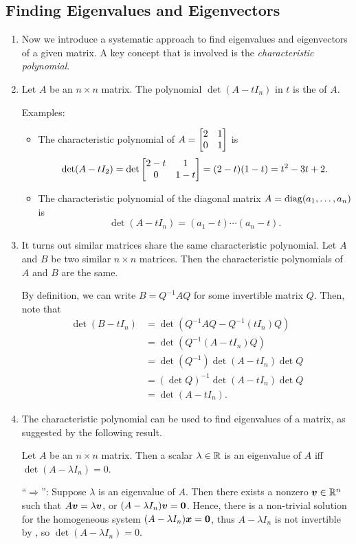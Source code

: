 \subsection{Finding Eigenvalues and Eigenvectors}
\label{subsect:find-eigen}
\begin{enumerate}
\item Now we introduce a systematic approach to find eigenvalues and
eigenvectors of a given matrix. A key concept that is involved is the
\emph{characteristic polynomial}.

\item Let \(A\) be an \(n\times n\) matrix. The polynomial \(\det (A-t I_n)\)
in \(t\) is the  of \(A\).

Examples:
\begin{itemize}
\item The characteristic polynomial of \(A=\mqty[2&1\\ 0&1]\) is
\[
\det(A-tI_2)=\det\mqty[2-t& 1\\ 0&1-t]=(2-t)(1-t)=t^2-3t+2.
\]
\item The characteristic polynomial of the diagonal matrix
\(A=\operatorname{diag}(a_1,\dotsc,a_n)\) is
\[
\det(A-tI_n)=(a_1-t)\dotsb(a_n-t).
\]
\end{itemize}

\item It turns out similar matrices share the same characteristic polynomial.
Let \(A\) and \(B\) be two similar \(n\times n\) matrices. Then the
characteristic polynomials of \(A\) and \(B\) are the same.

\begin{pf}
By definition, we can write \(B=Q^{-1}AQ\) for some invertible matrix \(Q\).
Then, note that
\begin{align*}
\det(B-tI_n)&=\det(Q^{-1}AQ-Q^{-1}(tI_n)Q) \\
&=\det(Q^{-1}(A-tI_n)Q) \\
&=\det(Q^{-1})\det(A-tI_n)\det Q \\
&=(\det Q)^{-1}\det(A-tI_n)\det Q \\
&=\det(A-tI_n).
\end{align*}
\end{pf}

\item The characteristic polynomial can be used to find eigenvalues of a
matrix, as suggested by the following result.

\begin{theorem}
\label{thm:eigenval-char-poly-roots}
Let \(A\) be an \(n\times n\) matrix. Then a scalar \(\lambda\in\mathbb{R}\) is an
eigenvalue of \(A\) iff \(\det(A-\lambda I_n)=0\).
\end{theorem}
\begin{pf}
``\(\Rightarrow\)'': Suppose \(\lambda\) is an eigenvalue of \(A\). Then there
exists a nonzero \(\vb*{v}\in\mathbb{R}^n\) such that \(A\vb*{v}=\lambda\vb*{v}\),
or \((A-\lambda I_n)\vb*{v}=\vb*{0}\). Hence, there is a non-trivial solution
for the homogeneous system \((A-\lambda I_n)\vb*{x}=\vb*{0}\), thus
\(A-\lambda I_n\) is not invertible by , so
\(\det(A-\lambda I_n)=0\).


\end{pf}
\end{enumerate}
